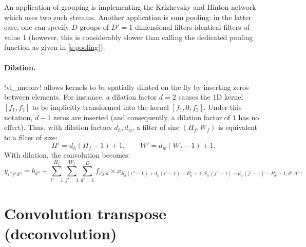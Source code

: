 An application of grouping is implementing the Krizhevsky and Hinton network~\cite{krizhevsky12imagenet} which uses two such streams. Another application is sum pooling; in the latter case, one can specify $D$ groups of $D'=1$ dimensional filters identical filters of value 1 (however, this is considerably slower than calling the dedicated pooling function as given in \cref{s:pooling}).

\paragraph{Dilation.} !vl_nnconv! allows kernels to be spatially dilated on the fly by inserting zeros between elements. For instance, a dilation factor $d=2$ causes the 1D kernel $[f_1,f_2]$ to be implicitly transformed into the kernel $[f_1,0,f_2]$. Under this notation, $d-1$ zeros are inserted (and consequently, a dilation factor of $1$ has no effect). Thus, with dilation factors $d_h,d_w$, a filter of size $(H_f,W_f)$ is equivalent to a filter of size:
\[
  H' = d_h(H_f - 1) + 1,
  \qquad
  W' = d_w(W_f - 1) + 1.
\]
With dilation, the convolution becomes:
\[
y_{i''j''d''}
=
b_{d''}
+
\sum_{i'=1}^{H_f}
\sum_{j'=1}^{W_f}
\sum_{d'=1}^D
f_{i'j'd} \times x_{
S_h (i''-1)+d_h(i'-1)-P_h^-+1,
S_w (j''-1)+d_w(j'-1)-P_w^-+1,
d',d''}.
\]


\section{Convolution transpose (deconvolution)}\label{s:convt}

